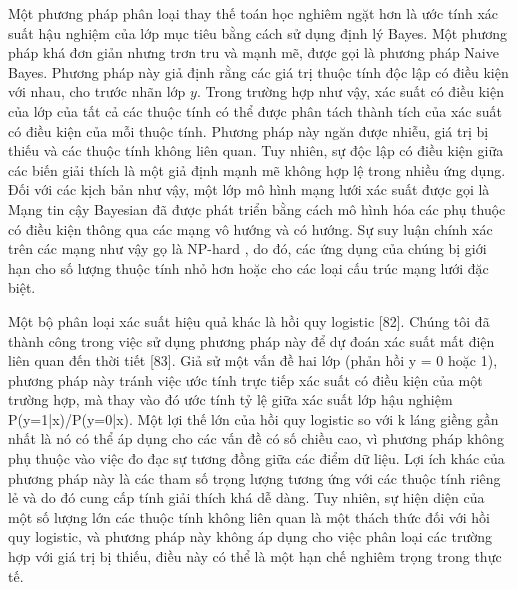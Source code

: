 \documentclass[utf8]{frontiersSCNS} %
\begin{document}
Một phương pháp phân loại thay thế toán học nghiêm ngặt hơn là ước tính xác suất hậu nghiệm của lớp mục tiêu bằng cách sử dụng định lý Bayes. Một phương pháp khá đơn giản nhưng trơn tru và mạnh mẽ, được gọi là phương pháp Naive Bayes. Phương pháp này giả định rằng các giá trị thuộc tính độc lập có điều kiện với nhau, cho trước nhãn lớp $y$. Trong trường hợp như vậy, xác suất có điều kiện của lớp của tất cả các thuộc tính có thể được phân tách thành tích của xác suất có điều kiện của mỗi thuộc tính. Phương pháp này ngăn được nhiễu, giá trị bị thiếu và các thuộc tính không liên quan. Tuy nhiên, sự độc lập có điều kiện giữa các biến giải thích là một giả định mạnh mẽ không hợp lệ trong nhiều ứng dụng. Đối với các kịch bản như vậy, một lớp mô hình mạng lưới xác suất được gọi là Mạng tin cậy Bayesian đã được phát triển bằng cách mô hình hóa các phụ thuộc có điều kiện thông qua các mạng vô hướng và có hướng. Sự suy luận chính xác trên các mạng như vậy gọ là NP-hard \citep{Cooper1990}, do đó, các ứng dụng của chúng bị giới hạn cho số lượng thuộc tính nhỏ hơn hoặc cho các loại cấu trúc mạng lưới đặc biệt.

Một bộ phân loại xác suất hiệu quả khác là hồi quy logistic [82]. Chúng tôi đã thành công trong việc sử dụng phương pháp này để dự đoán xác suất mất điện liên quan đến thời tiết [83]. Giả sử một vấn đề hai lớp (phản hồi y = 0 hoặc 1), phương pháp này tránh việc ước tính trực tiếp xác suất có điều kiện của một trường hợp, mà thay vào đó ước tính tỷ lệ giữa xác suất lớp hậu nghiệm P(y=1|x)/P(y=0|x). Một lợi thế lớn của hồi quy logistic so với k láng giềng gần nhất là nó có thể áp dụng cho các vấn đề có số chiều cao, vì phương pháp không phụ thuộc vào việc đo đạc sự tương đồng giữa các điểm dữ liệu. Lợi ích khác của phương pháp này là các tham số trọng lượng tương ứng với các thuộc tính riêng lẻ và do đó cung cấp tính giải thích khá dễ dàng. Tuy nhiên, sự hiện diện của một số lượng lớn các thuộc tính không liên quan là một thách thức đối với hồi quy logistic, và phương pháp này không áp dụng cho việc phân loại các trường hợp với giá trị bị thiếu, điều này có thể là một hạn chế nghiêm trọng trong thực tế.
\end{document}
